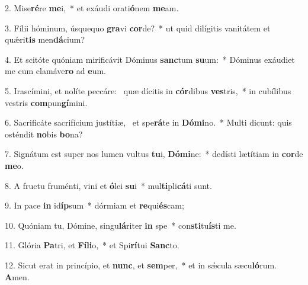 2. Mise\textbf{ré}re \textbf{me}i,~*  et exáudi orati\textbf{ó}nem \textbf{me}am.\

3. Fílii hóminum, úsquequo \textbf{gra}vi \textbf{cor}de?~*  ut quid dilígitis vanitátem et quǽri\textbf{tis} men\textbf{dá}cium?\

4. Et scitóte quóniam mirificávit Dóminus \textbf{sanc}tum \textbf{su}um:~*  Dóminus exáudiet me cum clamáve\textbf{ro} ad \textbf{e}um.\

5. Irascímini, et nolíte peccáre: \dag\  quæ dícitis in \textbf{cór}dibus \textbf{ves}tris,~*  in cubílibus vestris \textbf{com}pun\textbf{gí}mini.\

6. Sacrificáte sacrifícium justítiæ, \dag\  et spe\textbf{rá}te in \textbf{Dó}\textbf{mi}no.~*  Multi dicunt: quis osténdit \textbf{no}bis \textbf{bo}na?\

7. Signátum est super nos lumen vultus \textbf{tu}i, \textbf{Dó}\textbf{mi}ne:~*  dedísti lætítiam in \textbf{cor}de \textbf{me}o.\

8. A fructu fruménti, vini et \textbf{ó}lei \textbf{su}i~*  mul\textbf{ti}pli\textbf{cá}ti sunt.\

9. In pace \textbf{in} id\textbf{íp}sum~*  dórmiam et \textbf{re}qui\textbf{és}cam;\

10. Quóniam tu, Dómine, singu\textbf{lá}riter \textbf{in} spe~*  con\textbf{sti}tu\textbf{ís}ti me.\

11. Glória \textbf{Pa}tri, et \textbf{Fí}\textbf{li}o,~*  et Spi\textbf{rí}tui \textbf{Sanc}to.\

12. Sicut erat in princípio, et \textbf{nunc}, et \textbf{sem}per,~*  et in sǽcula sæcu\textbf{ló}rum. \textbf{A}men.\

